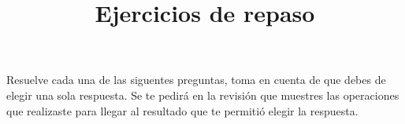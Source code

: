 

\title{Ejercicios de repaso \vspace{-2cm}}
\author{}
\date{ }

\renewcommand\thechoice{\Alph{choice})}
\newcommand\choicelabel{\thechoice}

\newenvironment{choices}%
  {\list{\choicelabel}%
     {\usecounter{choice}\def\makelabel##1{\hss\llap{##1}}%
       \settowidth{\leftmargin}{W.\hskip\labelsep\hskip 2.5em}%
       \def\choice{%
         \item
       } %
       \labelwidth\leftmargin\advance\labelwidth-\labelsep
       \topsep=0pt
       \partopsep=0pt
     }%
  }%
  {\endlist}

\newenvironment{oneparchoices}%
  {%
    \setcounter{choice}{0}%
    \def\choice{%
      \refstepcounter{choice}%
      \ifnum\value{choice}>1\relax
        \penalty -50\hskip 1em plus 1em\relax
      \fi
      \choicelabel
      \nobreak\enskip
    }%
    \ifvmode\else\enskip\fi
    \ignorespaces
  }%
  {}


\maketitle
\fontsize{14}{14}\selectfont

Resuelve cada una de las siguentes preguntas, toma en cuenta de que debes de elegir una sola respuesta. Se te pedirá en la revisión que muestres las operaciones que realizaste para llegar al resultado que te permitió elegir la respuesta.

